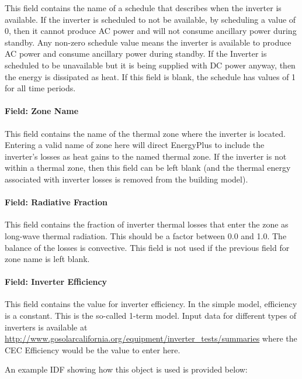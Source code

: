This field contains the name of a schedule that describes when the inverter is available. If the inverter is scheduled to not be available, by scheduling a value of 0, then it cannot produce AC power and will not consume ancillary power during standby. Any non-zero schedule value means the inverter is available to produce AC power and consume ancillary power during standby. If the Inverter is scheduled to be unavailable but it is being supplied with DC power anyway, then the energy is dissipated as heat. If this field is blank, the schedule has values of 1 for all time periods.

\paragraph{Field: Zone Name}\label{field-zone-name-1-003}

This field contains the name of the thermal zone where the inverter is located. Entering a valid name of zone here will direct EnergyPlus to include the inverter's losses as heat gains to the named thermal zone. If the inverter is not within a thermal zone, then this field can be left blank (and the thermal energy associated with inverter losses is removed from the building model).

\paragraph{Field: Radiative Fraction}\label{field-radiative-fraction-1}

This field contains the fraction of inverter thermal losses that enter the zone as long-wave thermal radiation. This should be a factor between 0.0 and 1.0. The balance of the losses is convective. This field is not used if the previous field for zone name is left blank.

\paragraph{Field: Inverter Efficiency}\label{field-inverter-efficiency}

This field contains the value for inverter efficiency. In the simple model, efficiency is a constant. This is the so-called 1-term model. Input data for different types of inverters is available at \url{http://www.gosolarcalifornia.org/equipment/inverter_tests/summaries} where the CEC Efficiency would be the value to enter here.

An example IDF showing how this object is used is provided below:

